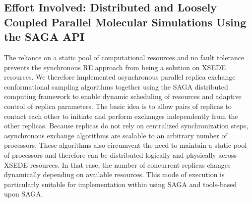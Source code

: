 \documentclass{sig-alternate}
\begin{document}
% 
% 
% 
% 
% 

\subsection{Effort Involved: Distributed and Loosely Coupled Parallel Molecular Simulations
Using the SAGA API}

The reliance on a static pool of computational resources and no
fault tolerance prevents the synchronous RE approach from being a
solution on XSEDE resources. We therefore implemented asynchronous
parallel replica exchange conformational sampling algorithms together
using the SAGA distributed computing framework to enable dynamic
scheduling of resources and adaptive control of replica
parameters. The basic idea is to allow pairs of replicas to contact
each other to initiate and perform exchanges independently from the
other replicas. Because replicas do not rely on centralized
synchronization steps, asynchronous exchange algorithms are scalable to an
arbitrary number of processors. These algorithms also circumvent
the need to maintain a static pool of processors and therefore
can be distributed logically and physically across XSEDE resources.
In that case, the number of concurrent replicas changes dynamically
depending on available resources. This mode of execution is particularly
suitable for implementation within using SAGA and tools-based upon SAGA.
\end{document}
